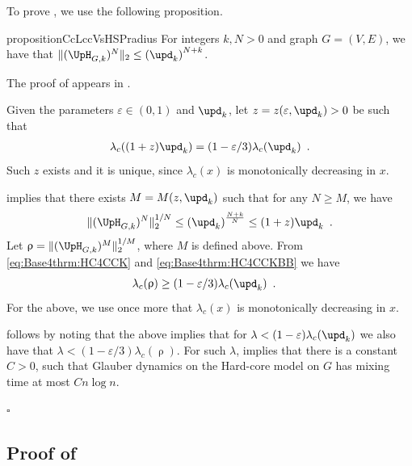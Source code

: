 \documentclass[11pt,reqno]{amsart}
\numberwithin{equation}{section}
\newcommand{\bluepigment}[1]{{\color{blue(pigment)}#1}}
\newcommand{\cadmiumgreen}[1]{{\color{cadmiumgreen}#1}}
\newcommand{\goldenbrown}[1]{{\color{goldenbrown}#1}}
\newcommand{\heliotrope}[1]{{\color{heliotrope}#1}}
\newcommand{\cconnective}{\goldenbrown{\upd}}
\newcommand{\lcritical}{{\lambda_c}}
\newcommand{\norm}[2]{\goldenbrown{\|} #1 \goldenbrown{\|}_{#2}}
\newcommand{\nnorm}[3]{\goldenbrown{\|} #1\goldenbrown{\|}^{#2}_{#3}}
\newcommand{\NBMatrix}{\cadmiumgreen{\UpH}_{G,\kk}}
\renewcommand{\bluepigment}[1]{#1}
\renewcommand{\cadmiumgreen}[1]{#1}
\renewcommand{\goldenbrown}[1]{#1}
\renewcommand{\heliotrope}[1]{#1}
\newcommand{\kk}{\bluepigment{k}}
\newcommand{\kx}{\heliotrope{x}}
\newcommand{\kz}{\cadmiumgreen{z}}
\renewcommand{\kk}{k}
\renewcommand{\kx}{x}
\renewcommand{\kz}{z}
\newcommand{\SingBound}{\uprho}
\begin{document}
To prove , we use the following proposition. 

\begin{restatable}{proposition}{CcLccVsHSPradius}\label{prop:HSPRadCCLCC}
%
For integers $\kk,N>0$ and graph $G=(V,E)$, we have that 
$\norm{(\NBMatrix)^N}{2} \leq \left( \cconnective_{\kk}\right)^{N+k}$.
%
\end{restatable}
The proof of  appears in .

%

Given the parameters $\varepsilon\in (0,1)$ and $\cconnective_{\kk}$,
 let $\kz=\kz(\varepsilon, \cconnective_{\kk})>0$ be  such that
\begin{align}\label{eq:Base4thrm:HC4CCK}
\lcritical((1+\kz)\cconnective_k)= (1-\varepsilon/3)\lcritical(\cconnective_k) \enspace.
\end{align}
Such $\kz$ exists and it is unique, since   $\lcritical(\kx)$ is monotonically decreasing in $\kx$. 

  implies that there exists $M=M(\kz,\cconnective_{\kk})$ such that for any $N\geq M$,
we have 
\begin{align}\label{eq:Base4thrm:HC4CCKBB}
\nnorm{ (\NBMatrix)^N}{1/N}{2} \leq \left( \cconnective_{\kk}\right)^{\frac{N+k}{N}}\leq (1+\kz)\cconnective_{\kk}\enspace. 
\end{align}
Let $\SingBound=\nnorm{ (\NBMatrix)^M}{1/M}{2}$, where $M$ is defined above. From \eqref{eq:Base4thrm:HC4CCK} and \eqref{eq:Base4thrm:HC4CCKBB}
we have
\begin{align}
\lcritical(\SingBound) &\geq (1-\varepsilon/3)\lcritical(\cconnective_k) \enspace.
\end{align}
For the above, we use once more that    $\lcritical(x)$ is monotonically decreasing in $x$. 

 follows by noting that the above implies that for $\lambda<(1-\varepsilon)\lcritical(\cconnective_k)$ we also have that 
$\lambda<(1-\varepsilon/3)\lcritical(\SingBound)$. For such $\lambda$,   implies that 
 there is a constant $C>0$, such that Glauber dynamics on the Hard-core model on $G$ 
has mixing time at most $C n\log n$.

\hfill $\square$


\subsection{Proof of }\label{sec:prop:HSPRadCCLCC}
\end{document}
